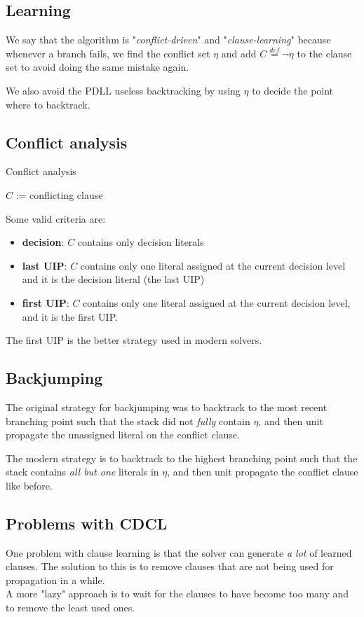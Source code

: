\documentclass{article}
\begin{document}
\subsection{Learning}
We say that the algorithm is "\textit{conflict-driven}" and "\textit{clause-learning}" because whenever a branch fails, we find the conflict set $\eta$ and add $C\overset{def}=\neg\eta$ to the clause set to avoid doing the same mistake again.

We also avoid the PDLL useless backtracking by using $\eta$ to decide the point where to backtrack.

\subsection{Conflict analysis}
\begin{algorithm}[h]
    \caption{Conflict analysis}
    $C$ := conflicting clause\;
\end{algorithm}
Some valid criteria are:
\begin{itemize}
    \item \textbf{decision}: $C$ contains only decision literals
    \item \textbf{last UIP}: $C$ contains only one literal assigned at the current decision level and it is the decision literal (the last UIP)
    \item \textbf{first UIP}: $C$ contains only one literal assigned at the current decision level, and it is the first UIP.
\end{itemize}
The first UIP is the better strategy used in modern solvers.

\subsection{Backjumping}
The original strategy for backjumping was to backtrack to the most recent branching point such that the stack did not \textit{fully} contain $\eta$, and then unit propagate the unassigned literal on the conflict clause.

The modern strategy is to backtrack to the highest branching point such that the stack contains \textit{all but one} literals in $\eta$, and then unit propagate the conflict clause like before.

\subsection{Problems with CDCL}
One problem with clause learning is that the solver can generate \textit{a lot} of learned clauses. The solution to this is to remove clauses that are not being used for propagation in a while.\\
A more "lazy" approach is to wait for the clauses to have become too many and to remove the least used ones.
\end{document}
